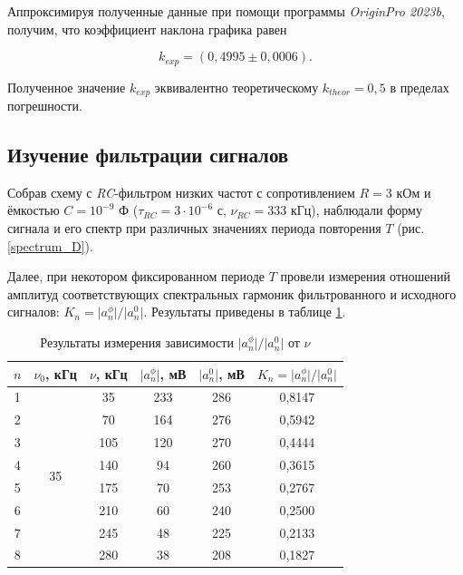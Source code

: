 \documentclass[a4paper, 12pt]{article}
\begin{document}
    Аппроксимируя полученные данные при помощи программы \textit{OriginPro 2023b}, получим, что коэффициент наклона графика равен

    \begin{equation*}
        k_{exp} = \left( 0,4995 \pm 0,0006 \right).
    \end{equation*}

    Полученное значение $k_{exp}$ эквивалентно теоретическому $k_{theor} = 0,5$ в пределах погрешности.

    \subsection{Изучение фильтрации сигналов}

    Собрав схему с \textit{RC}-фильтром низких частот с сопротивлением $R = 3$ кОм и ёмкостью $C = 10^{-9} \text{ Ф}$ ($\tau_{RC} = 3 \cdot 10^{-6}$ с, $\nu_{RC} = 333$ кГц), наблюдали форму сигнала и его спектр при различных значениях периода повторения $T$ (рис. \ref{spectrum_D}).

    Далее, при некотором фиксированном периоде $T$ провели измерения отношений амплитуд соответствующих спектральных гармоник фильтрованного и исходного сигналов: $K_n = \lvert a_n^{\phi} \rvert / \lvert a_n^{0} \rvert$. Результаты приведены в таблице \ref{table:K(nu)}.

    \begin{table}[H]
        \centering
        \begin{tabular}{|c|c|c|c|c|c|}
        \hline
        $n$ & $\nu_0$, кГц & $\nu$, кГц & $\lvert a_n^{\phi} \rvert$, мВ & $\lvert a_n^{0} \rvert$, мВ & $K_n = \lvert a_n^{\phi} \rvert / \lvert a_n^{0} \rvert$ \\ \hline
        1 & \multirow{8}{*}{35} & 35 & 233 & 286 & 0,8147 \\ \cline{1-1} \cline{3-6} 
        2 &  & 70 & 164 & 276 & 0,5942 \\ \cline{1-1} \cline{3-6} 
        3 &  & 105 & 120 & 270 & 0,4444 \\ \cline{1-1} \cline{3-6} 
        4 &  & 140 & 94 & 260 & 0,3615 \\ \cline{1-1} \cline{3-6} 
        5 &  & 175 & 70 & 253 & 0,2767 \\ \cline{1-1} \cline{3-6} 
        6 &  & 210 & 60 & 240 & 0,2500 \\ \cline{1-1} \cline{3-6} 
        7 &  & 245 & 48 & 225 & 0,2133 \\ \cline{1-1} \cline{3-6} 
        8 &  & 280 & 38 & 208 & 0,1827 \\ \hline
        \end{tabular}
        \caption{Результаты измерения зависимости $\lvert a_n^{\phi} \rvert / \lvert a_n^{0} \rvert$ от $\nu$}
        \label{table:K(nu)}
    \end{table}
    
\end{document}
